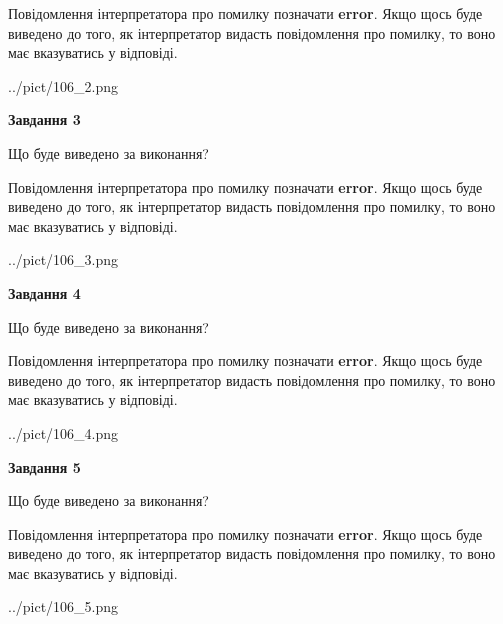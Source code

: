 \documentclass[12pt, ukrainian]{article}
\begin{document}
{\begin {large}
Повідомлення інтерпретатора про помилку позначати \textbf{error}.
Якщо щось буде виведено до того, як інтерпретатор видасть повідомлення про помилку, 
то воно має вказуватись у відповіді. \par


\begin{center}
	{../pict/106_2.png}
\end{center}
\newpage

{\begin {center}\textbf{Завдання 3}\end {center}}\par
Що буде виведено за виконання?

Повідомлення інтерпретатора про помилку позначати \textbf{error}.
Якщо щось буде виведено до того, як інтерпретатор видасть повідомлення про помилку, 
то воно має вказуватись у відповіді. \par


\begin{center}
	{../pict/106_3.png}
\end{center}
\newpage

{\begin {center}\textbf{Завдання 4}\end {center}}\par
Що буде виведено за виконання?

Повідомлення інтерпретатора про помилку позначати \textbf{error}.
Якщо щось буде виведено до того, як інтерпретатор видасть повідомлення про помилку, 
то воно має вказуватись у відповіді. \par


\begin{center}
	{../pict/106_4.png}
\end{center}
\newpage

{\begin {center}\textbf{Завдання 5}\end {center}}\par
Що буде виведено за виконання?

Повідомлення інтерпретатора про помилку позначати \textbf{error}.
Якщо щось буде виведено до того, як інтерпретатор видасть повідомлення про помилку, 
то воно має вказуватись у відповіді. \par


\begin{center}
	{../pict/106_5.png}
\end{center}
\newpage


\end{large}}
\end{document}
